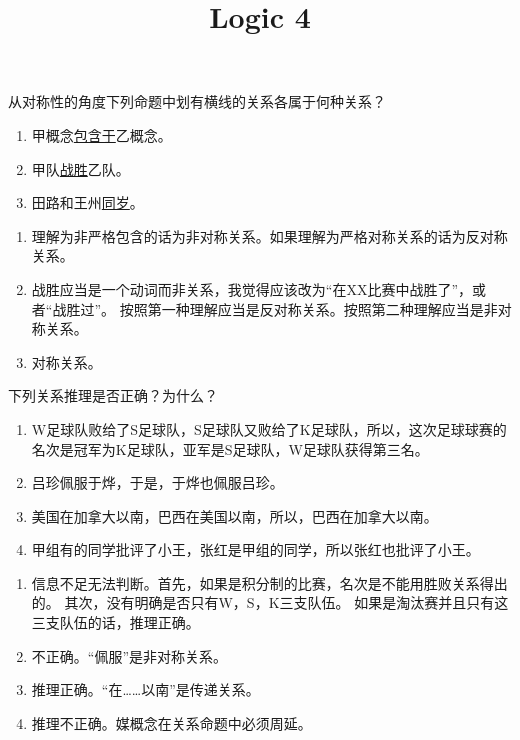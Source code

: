 \documentclass{ctexart}
\newif\ifpreface
\begin{document}
\large
\setlength{\baselineskip}{1.2em}
\ifpreface
  
\else
  \title{Logic 4}
  \maketitle
\fi
\begin{problem}\label{pro:1}
  从对称性的角度下列命题中划有横线的关系各属于何种关系？
  \begin{enumerate}
    \item 甲概念\underline{包含于}乙概念。
    \item 甲队\underline{战胜}乙队。
    \item 田路和王州\underline{同岁}。
  \end{enumerate}
\end{problem}
\begin{solution}
  \begin{enumerate}
    \item 理解为非严格包含的话为非对称关系。如果理解为严格对称关系的话为反对称关系。
    \item 战胜应当是一个动词而非关系，我觉得应该改为``在XX比赛中战胜了''，或者``战胜过''。
      按照第一种理解应当是反对称关系。按照第二种理解应当是非对称关系。
    \item 对称关系。
  \end{enumerate}
\end{solution}
\begin{problem}\label{pro:2}
  下列关系推理是否正确？为什么？
  \begin{enumerate}
    \item W足球队败给了S足球队，S足球队又败给了K足球队，所以，这次足球球赛的名次是冠军为K足球队，亚军是S足球队，W足球队获得第三名。
    \item 吕珍佩服于烨，于是，于烨也佩服吕珍。
    \item 美国在加拿大以南，巴西在美国以南，所以，巴西在加拿大以南。
    \item 甲组有的同学批评了小王，张红是甲组的同学，所以张红也批评了小王。
  \end{enumerate}
\end{problem}
\begin{solution}
  \begin{enumerate}
    \item 信息不足无法判断。首先，如果是积分制的比赛，名次是不能用胜败关系得出的。
      其次，没有明确是否只有W，S，K三支队伍。
      如果是淘汰赛并且只有这三支队伍的话，推理正确。
    \item 不正确。``佩服''是非对称关系。
    \item 推理正确。``在……以南''是传递关系。
    \item 推理不正确。媒概念在关系命题中必须周延。
  \end{enumerate}
\end{solution}
\end{document}
